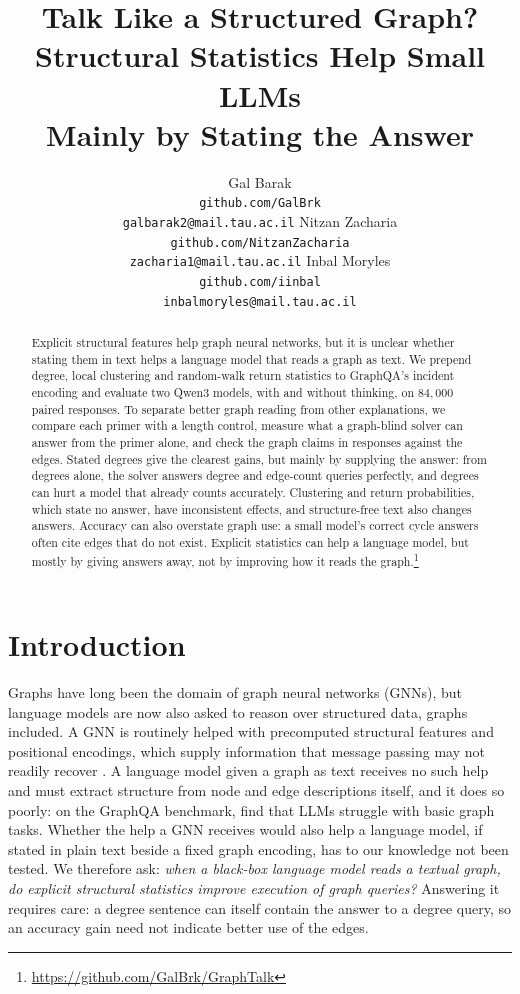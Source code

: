 \documentclass[11pt]{article}
\title{Talk Like a Structured Graph? Structural Statistics Help Small LLMs\\Mainly by Stating the Answer}
\author{
  Gal Barak\\
  \footnotesize\texttt{github.com/GalBrk}\\
  \footnotesize\texttt{galbarak2@mail.tau.ac.il}
  \And
  Nitzan Zacharia\\
  \footnotesize\texttt{github.com/NitzanZacharia}\\
  \footnotesize\texttt{zacharia1@mail.tau.ac.il}
  \And
  Inbal Moryles\\
  \footnotesize\texttt{github.com/iinbal}\\
  \footnotesize\texttt{inbalmoryles@mail.tau.ac.il}
}
\date{}
\begin{document}
\raggedbottom
\maketitle
\begin{abstract}
Explicit structural features help graph neural networks, but it is unclear whether stating them in text helps a language model that reads a graph as text. We prepend degree, local clustering and random-walk return statistics to GraphQA's incident encoding and evaluate two Qwen3 models, with and without thinking, on $84{,}000$ paired responses. To separate better graph reading from other explanations, we compare each primer with a length control, measure what a graph-blind solver can answer from the primer alone, and check the graph claims in responses against the edges. Stated degrees give the clearest gains, but mainly by supplying the answer: from degrees alone, the solver answers degree and edge-count queries perfectly, and degrees can hurt a model that already counts accurately. Clustering and return probabilities, which state no answer, have inconsistent effects, and structure-free text also changes answers. Accuracy can also overstate graph use: a small model's correct cycle answers often cite edges that do not exist. Explicit statistics can help a language model, but mostly by giving answers away, not by improving how it reads the graph.\footnote{\url{https://github.com/GalBrk/GraphTalk}} %
\end{abstract}

\section{Introduction}
\label{sec:intro}
Graphs have long been the domain of graph neural networks (GNNs), but language models are now also asked to reason over structured data, graphs included. A GNN is routinely helped with precomputed structural features and positional encodings, which supply information that message passing may not readily recover \citep{dwivedi2022graph,rampasek2022recipe}. A language model given a graph as text receives no such help and must extract structure from node and edge descriptions itself, and it does so poorly: on the GraphQA benchmark, \citet{fatemi2023talklikeagraph} find that LLMs struggle with basic graph tasks. Whether the help a GNN receives would also help a language model, if stated in plain text beside a fixed graph encoding, has to our knowledge not been tested. We therefore ask: \emph{when a black-box language model reads a textual graph, do explicit structural statistics improve execution of graph queries?} Answering it requires care: a degree sentence can itself contain the answer to a degree query, so an accuracy gain need not indicate better use of the edges.
\end{document}
